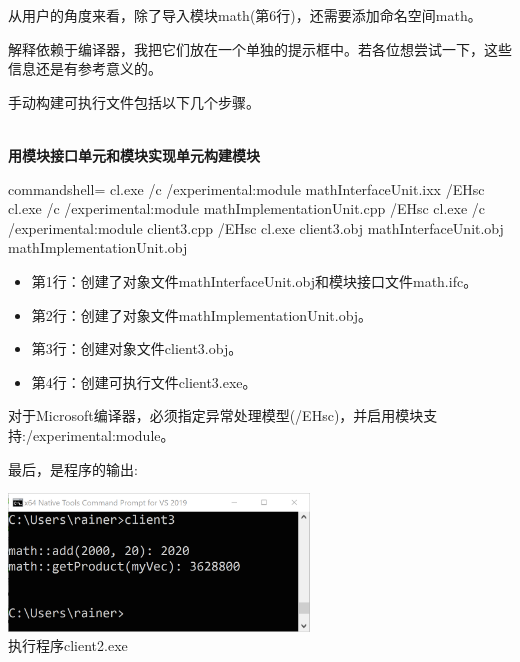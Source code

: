 从用户的角度来看，除了导入模块math(第6行)，还需要添加命名空间math。

解释依赖于编译器，我把它们放在一个单独的提示框中。若各位想尝试一下，这些信息还是有参考意义的。


\begin{tcolorbox}[breakable,enhanced jigsaw,colback=blue!5!white,colframe=blue!75!black,title={使用Microsoft编译器构建可执行文件}]
	
手动构建可执行文件包括以下几个步骤。

\hspace*{\fill} \\ %
\noindent
\textbf{用模块接口单元和模块实现单元构建模块}
\begin{tcblisting}{commandshell={}}
cl.exe /c /experimental:module mathInterfaceUnit.ixx /EHsc
cl.exe /c /experimental:module mathImplementationUnit.cpp /EHsc
cl.exe /c /experimental:module client3.cpp /EHsc
cl.exe client3.obj mathInterfaceUnit.obj mathImplementationUnit.obj
\end{tcblisting}

\begin{itemize}
\item 
第1行：创建了对象文件mathInterfaceUnit.obj和模块接口文件math.ifc。

\item 
第2行：创建了对象文件mathImplementationUnit.obj。

\item 
第3行：创建对象文件client3.obj。

\item 
第4行：创建可执行文件client3.exe。
\end{itemize}

对于Microsoft编译器，必须指定异常处理模型(/EHsc)，并启用模块支持:/experimental:module。

最后，是程序的输出:

\begin{center}
\includegraphics[width=0.6\textwidth]{content/3/chapter4/images/20.png}\\
执行程序client2.exe
\end{center}
\end{tcolorbox}

